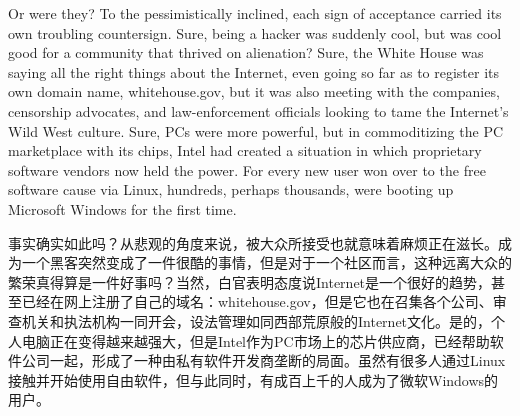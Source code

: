 \ifdefined\eng
Or were they? To the pessimistically inclined, each sign of acceptance carried its own troubling countersign. Sure, being a hacker was suddenly cool, but was cool good for a community that thrived on alienation? Sure, the White House was saying all the right things about the Internet, even going so far as to register its own domain name, whitehouse.gov, but it was also meeting with the companies, censorship advocates, and law-enforcement officials looking to tame the Internet's Wild West culture. Sure, PCs were more powerful, but in commoditizing the PC marketplace with its chips, Intel had created a situation in which proprietary software vendors now held the power. For every new user won over to the free software cause via Linux, hundreds, perhaps thousands, were booting up Microsoft Windows for the first time.
\fi

\ifdefined\chs
事实确实如此吗？从悲观的角度来说，被大众所接受也就意味着麻烦正在滋长。成为一个黑客突然变成了一件很酷的事情，但是对于一个社区而言，这种远离大众的繁荣真得算是一件好事吗？当然，白官表明态度说Internet是一个很好的趋势，甚至已经在网上注册了自己的域名：whitehouse.gov，但是它也在召集各个公司、审查机关和执法机构一同开会，设法管理如同西部荒原般的Internet文化。是的，个人电脑正在变得越来越强大，但是Intel作为PC市场上的芯片供应商，已经帮助软件公司一起，形成了一种由私有软件开发商垄断的局面。虽然有很多人通过Linux接触并开始使用自由软件，但与此同时，有成百上千的人成为了微软Windows的用户。
\fi



